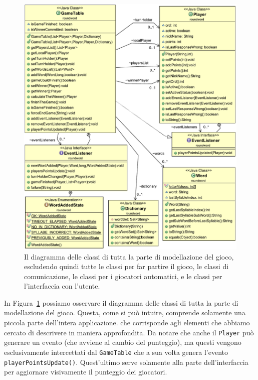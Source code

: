 \documentclass[10.5pt]{article}
\begin{document}
\begin{figure}
	\vspace*{-1in}
	\begin{center}
		\hspace*{-0.5in}
		\includegraphics[scale=0.95]{imgs/ClassDiagram1.pdf}
		\caption{Il diagramma delle classi di tutta la parte di modellazione del gioco, escludendo quindi tutte le classi per far partire il gioco, le classi di comunicazione, le classi per i giocatori automatici, e le classi per l'interfaccia con l'utente.}\label{fig:class_diagram1}
	\end{center}
\end{figure}

In Figura~\ref{fig:class_diagram1} possiamo osservare il diagramma delle classi di tutta la parte di modellazione del gioco. Questa, come si può intuire, comprende solamente una piccola parte dell'intera applicazione. che corrisponde agli elementi che abbiamo cercato di descrivere in maniera approfondita. Da notare che anche il \texttt{Player} può generare un evento (che avviene al cambio del punteggio), ma questi vengono esclusivamente intercettati dal \texttt{GameTable} che a sua volta genera l'evento \texttt{playerPointsUpdate()}. Quest'ultimo serve solamente alla parte dell'interfaccia per aggiornare visivamente il punteggio dei giocatori.
\end{document}
